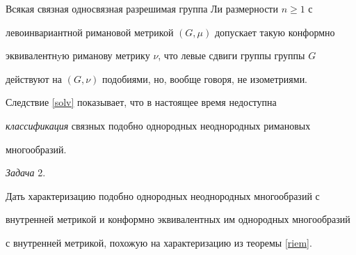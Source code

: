 \begin{cors}


\label{solv}


Всякая связная односвязная разрешимая группа Ли размерности $n\geq 1$ с


левоинвариантной римановой метрикой $(G,\mu)$ допускает такую конформно


эквивалентнyю риманову метрику $\nu$, что левые сдвиги группы группы $G$


действуют на $(G,\nu)$ подобиями, но, вообще говоря, не изометриями.


\end{cors}





\begin{notes}


Следствие \ref{solv} показывает, что в настоящее время недоступна


{\it классификация} связных подобно однородных неоднородных римановых


многообразий.


\end{notes}





{\it Задача} 2.


Дать характеризацию подобно однородных неоднородных многообразий с


внутренней метрикой и конформно эквивалентных им однородных многообразий


с внутренней метрикой, похожую на характеризацию из теоремы \ref{riem}.








